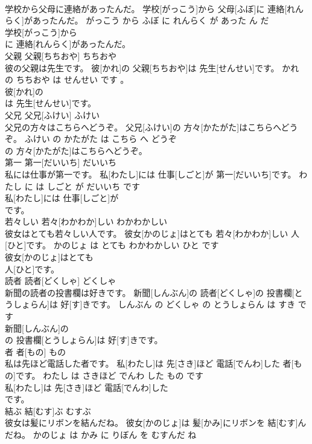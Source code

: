 \documentclass[8pt]{extreport}
\begin{document}
\begin{CJK}{UTF8}{min}
\\	学校から父母に連絡があったんだ。	学校[がっこう]から 父母[ふぼ]に 連絡[れんらく]があったんだ。	がっこう から ふぼ に れんらく が あった ん だ	
\\	学校[がっこう]から
\\	に 連絡[れんらく]があったんだ。			
\\	父親	父親[ちちおや]	ちちおや	
\\	彼の父親は先生です。	彼[かれ]の 父親[ちちおや]は 先生[せんせい]です。	かれ の ちちおや は せんせい です 。	
\\	彼[かれ]の
\\	は 先生[せんせい]です。			
\\	父兄	父兄[ふけい]	ふけい	
\\	父兄の方々はこちらへどうぞ。	父兄[ふけい]の 方々[かたがた]はこちらへどうぞ。	ふけい の かたがた は こちら へ どうぞ	
\\	の 方々[かたがた]はこちらへどうぞ。			
\\	第一	第一[だいいち]	だいいち	
\\	私には仕事が第一です。	私[わたし]には 仕事[しごと]が 第一[だいいち]です。	わたし に は しごと が だいいち です	
\\	私[わたし]には 仕事[しごと]が
\\	です。			
\\	若々しい	若々[わかわか]しい	わかわかしい	
\\	彼女はとても若々しい人です。	彼女[かのじょ]はとても 若々[わかわか]しい 人[ひと]です。	かのじょ は とても わかわかしい ひと です	
\\	彼女[かのじょ]はとても
\\	人[ひと]です。			
\\	読者	読者[どくしゃ]	どくしゃ	
\\	新聞の読者の投書欄は好きです。	新聞[しんぶん]の 読者[どくしゃ]の 投書欄[とうしょらん]は 好[す]きです。	しんぶん の どくしゃ の とうしょらん は すき です	
\\	新聞[しんぶん]の
\\	の 投書欄[とうしょらん]は 好[す]きです。			
\\	者	者[もの]	もの	
\\	私は先ほど電話した者です。	私[わたし]は 先[さき]ほど 電話[でんわ]した 者[もの]です。	わたし は さきほど でんわ した もの です	
\\	私[わたし]は 先[さき]ほど 電話[でんわ]した
\\	です。			
\\	結ぶ	結[むす]ぶ	むすぶ	
\\	彼女は髪にリボンを結んだね。	彼女[かのじょ]は 髪[かみ]にリボンを 結[むす]んだね。	かのじょ は かみ に りぼん を むすんだ ね	

\end{CJK}
\end{document}

